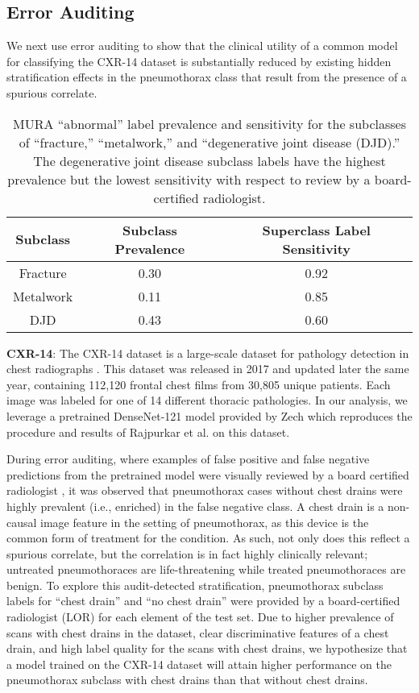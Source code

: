 \documentclass[sigconf]{acmart}
\begin{document}
\subsection{Error Auditing}

We next use error auditing to show that the clinical utility of a common model for classifying the CXR-14 dataset is substantially reduced by existing hidden stratification effects in the pneumothorax class that result from the presence of a spurious correlate.

 \begin{table}[htb!]
\centering
\begin{tabular}{ccc}
 \toprule
 Subclass & Subclass Prevalence & Superclass Label Sensitivity \\
 \toprule
 Fracture & 0.30 & 0.92   \\
 Metalwork & 0.11 & 0.85    \\
 DJD & 0.43 & 0.60 \\
 \toprule
\end{tabular}
\caption{MURA ``abnormal'' label prevalence and sensitivity for the subclasses of ``fracture,'' ``metalwork,'' and ``degenerative joint disease (DJD).'' The degenerative joint disease subclass labels have the highest prevalence but the lowest sensitivity with respect to review by a board-certified radiologist.}
\label{tab:mura2}
\end{table}

\textbf{CXR-14}: The CXR-14 dataset is a large-scale dataset for pathology detection in chest radiographs \citep{Wang2017-vm}. 
This dataset was released in 2017 and updated later the same year, containing 112,120 frontal chest films from 30,805 unique patients.   
Each image was labeled for one of 14 different thoracic pathologies.  
In our analysis, we leverage a pretrained DenseNet-121 model provided by Zech \citep{Zech_undated-cw} which reproduces the procedure and results of Rajpurkar et al. \citep{Rajpurkar2018-gc} on this dataset.  

During error auditing, where examples of false positive and false negative predictions from the pretrained model were visually reviewed by a board certified radiologist \citep{Oakden-Rayner2019-yi},
it was observed that pneumothorax cases without chest drains were highly prevalent (i.e., enriched) in the false negative class.
A chest drain is a non-causal image feature in the setting of pneumothorax, as this device is the common form of treatment for the condition. 
As such, not only does this reflect a spurious correlate, but the correlation is in fact highly clinically relevant; untreated pneumothoraces are life-threatening while treated pneumothoraces are benign.
 To explore this audit-detected stratification, pneumothorax subclass labels for ``chest drain'' and ``no chest drain'' were provided by a board-certified radiologist (LOR) for each element of the test set.  
 Due to higher prevalence of scans with chest drains in the dataset, clear discriminative features of a chest drain, and high label quality for the scans with chest drains, we hypothesize that a model trained on the CXR-14 dataset will attain higher performance on the pneumothorax subclass with chest drains than that without chest drains.  
\end{document}
